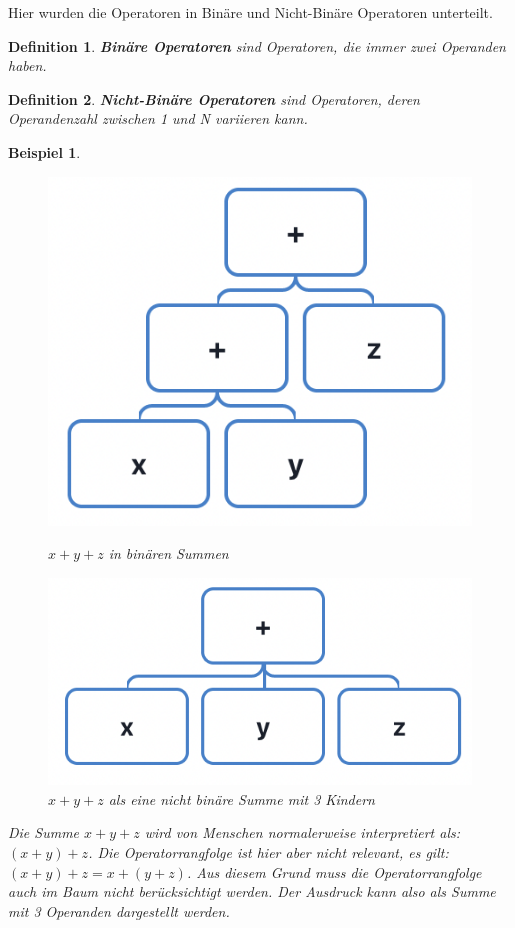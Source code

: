 \documentclass[11pt]{article}
\newtheorem{defin}{Definition}
\newtheorem{example}{Beispiel}
\begin{document}
Hier wurden die Operatoren in Binäre und Nicht-Binäre Operatoren unterteilt.
\begin{defin}
  \textbf{Binäre Operatoren} sind Operatoren, die immer zwei Operanden haben.
\end{defin} 
\begin{defin}
  \textbf{Nicht-Binäre Operatoren} sind Operatoren, deren Operandenzahl zwischen 1 und N variieren kann.
\end{defin}
\begin{example} \normalfont
  \begin{figure}[h]
  \begin{minipage}{.5\textwidth}
    \centering
    \includegraphics[scale=0.5]{trees/beispiel_non_binary_1.png}
    \caption{$x+y+z$ in binären Summen}
  \end{minipage}
  \begin{minipage}{.5\textwidth}
    \centering
    \includegraphics[scale=0.5]{trees/beispiel_non_binary_2.png}
    \caption{$x+y+z$ als eine nicht binäre Summe mit 3 Kindern}
  \end{minipage}
  \end{figure}
  Die Summe $x+y+z$ wird von Menschen normalerweise interpretiert als: $(x+y)+z$.
  Die Operatorrangfolge ist hier aber nicht relevant, es gilt:
  $(x+y)+z = x+(y+z)$. Aus diesem Grund muss die Operatorrangfolge auch im Baum
  nicht berücksichtigt werden. Der Ausdruck kann also als Summe mit 3 Operanden dargestellt werden.
\end{example}
\end{document}
